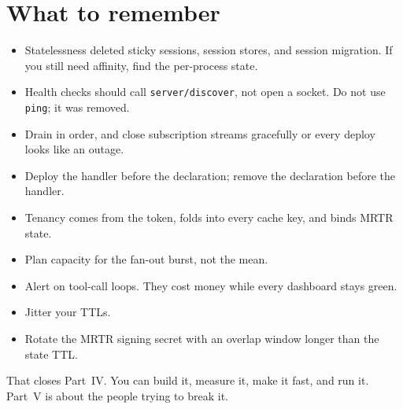 \section{What to remember}

\begin{itemize}[leftmargin=1.6em, itemsep=3pt]
\item Statelessness deleted sticky sessions, session stores, and session
migration. If you still need affinity, find the per-process state.
\item Health checks should call \texttt{server/discover}, not open a socket. Do
not use \texttt{ping}; it was removed.
\item Drain in order, and close subscription streams gracefully or every deploy
looks like an outage.
\item Deploy the handler before the declaration; remove the declaration before
the handler.
\item Tenancy comes from the token, folds into every cache key, and binds MRTR
state.
\item Plan capacity for the fan-out burst, not the mean.
\item Alert on tool-call loops. They cost money while every dashboard stays
green.
\item Jitter your TTLs.
\item Rotate the MRTR signing secret with an overlap window longer than the state
TTL.
\end{itemize}

That closes Part~IV. You can build it, measure it, make it fast, and run it.
Part~V is about the people trying to break it.
